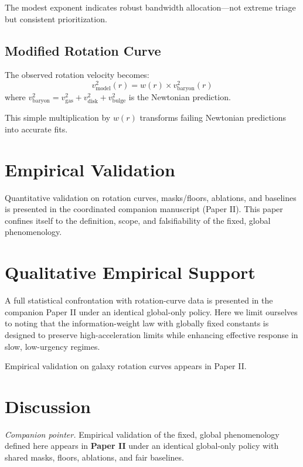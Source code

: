 \documentclass[usenatbib]{mnras}
\begin{document}
The modest exponent indicates robust bandwidth allocation---not extreme triage but consistent prioritization.

\subsection{Modified Rotation Curve}

The observed rotation velocity becomes:
\begin{equation}
v_{\text{model}}^2(r) = w(r) \times v_{\text{baryon}}^2(r)
\end{equation}
where $v_{\text{baryon}}^2 = v_{\text{gas}}^2 + v_{\text{disk}}^2 + v_{\text{bulge}}^2$ is the Newtonian prediction.

This simple multiplication by $w(r)$ transforms failing Newtonian predictions into accurate fits.

\section{Empirical Validation}

Quantitative validation on rotation curves, masks/floors, ablations, and baselines is presented in the coordinated companion manuscript (Paper II). This paper confines itself to the definition, scope, and falsifiability of the fixed, global phenomenology.

\section{Qualitative Empirical Support}
\label{sec:qualitative}

A full statistical confrontation with rotation-curve data is presented in the companion Paper II under an identical global-only policy. Here we limit ourselves to noting that the information-weight law with globally fixed constants is designed to preserve high-acceleration limits while enhancing effective response in slow, low-urgency regimes.

Empirical validation on galaxy rotation curves appears in Paper II.

\section{Discussion}

\noindent\textit{Companion pointer.} Empirical validation of the fixed, global phenomenology defined here appears in \textbf{Paper II} under an identical global-only policy with shared masks, floors, ablations, and fair baselines.
\end{document}
